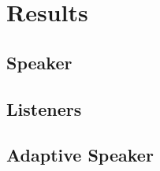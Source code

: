 
\section{Results}
\label{sec:results}
\subsection{Speaker}

\subsection{Listeners}

\subsection{Adaptive Speaker}
